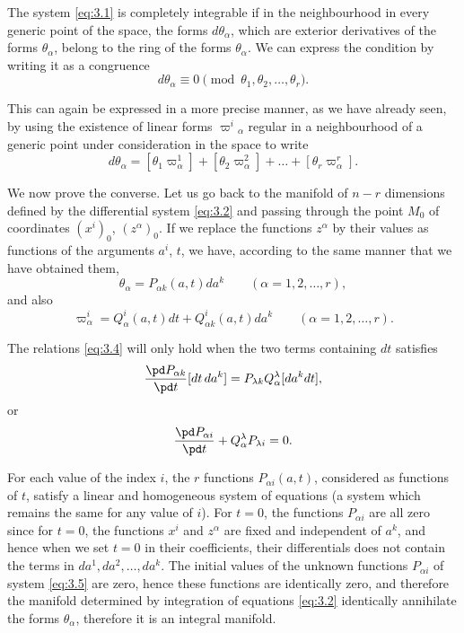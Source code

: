 \begin{thm*}
   The system \eqref{eq:3.1} is completely integrable if in the neighbourhood in every generic point of the space, the forms $d\theta_{\alpha}$, which are exterior derivatives of the forms $\theta_{\alpha}$, belong to the ring of the forms $\theta_{\alpha}$. \rm{We can express the condition by writing it as a congruence}
\[
d\theta_{\alpha}\equiv 0\pmod{\theta_{1},\theta_{2},\dots,\theta_{r}}.
\]
\end{thm*}

This can again be expressed in a more precise manner, as we have already seen, by using the existence of linear forms $\varpi^{i}{}_{\alpha}$ regular in a neighbourhood of a generic point under consideration in the space to write
\begin{equation}
  \label{eq:3.4}
  d\theta_{\alpha}=[\theta_{1}\varpi^{1}_{\alpha}]+[\theta_{2}\varpi^{2}_{\alpha}]+\dots+[\theta_{r}\varpi^{r}_{\alpha}].
\end{equation}

\vspace{12pt}\fsec We now prove the converse. Let us go back to the manifold of $n-r$ dimensions defined by the differential system \eqref{eq:3.2} and passing through the point $M_{0}$ of coordinates $(x^{i})_{0}$, $(z^{\alpha})_{0}$. If we replace the functions $z^{\alpha}$ by their values as functions of the arguments $a^{i}$, $t$, we have, according to the same manner that we have obtained them,
\[
\theta_{\alpha}=P_{\alpha k}(a,t)da^{k}\qquad(\alpha=1,2,\dots,r),
\]
and also
\[
\varpi^{i}_{\alpha}=Q^{i}_{\alpha}(a,t)dt+Q^{i}_{\alpha k}(a,t)da^{k}\qquad(\alpha=1,2,\dots,r).
\]

The relations \eqref{eq:3.4} will only hold when the two terms containing $dt$ satisfies
\[
\frac{\pd P_{\alpha k}}{\pd t}[dt\,da^{k}]=P_{\lambda k}Q^{\lambda}_{\alpha}[da^{k}dt],
\]
or
\begin{equation}
  \label{eq:3.5}
  \frac{\pd P_{\alpha i}}{\pd t}+Q^{\lambda}_{\alpha}P_{\lambda i}=0.
\end{equation}

For each value of the index $i$, the $r$ functions $P_{\alpha i}(a,t)$, considered as functions of $t$, satisfy a linear and homogeneous system of equations (a system which remains the same for any value of $i$). For $t=0$, the functions $P_{\alpha i}$ are all zero since for $t=0$, the functions $x^{i}$ and $z^{\alpha}$ are fixed and independent of $a^{k}$, and hence when we set $t=0$ in their coefficients, their differentials does not contain the terms in $da^{1},da^{2},\dots,da^{k}$. The initial values of the unknown functions $P_{\alpha i}$ of system \eqref{eq:3.5} are zero, hence these functions are identically zero, and therefore the manifold determined by integration of equations \eqref{eq:3.2} identically annihilate the forms $\theta_{\alpha}$, therefore it is an integral manifold.

